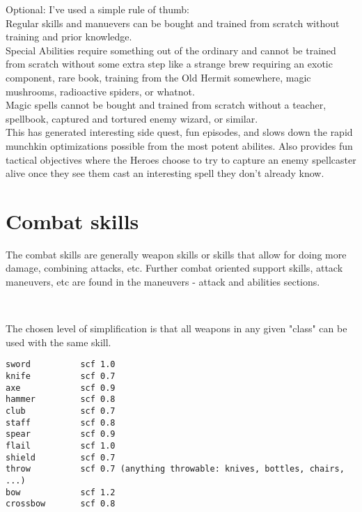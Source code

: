 Optional: I've used a simple rule of thumb: \\
Regular skills and manuevers can be bought and trained from scratch without training and prior knowledge. \\
Special Abilities require something out of the ordinary and cannot be trained from scratch without some extra step like a strange brew requiring an exotic component, rare book, training from the Old Hermit somewhere, magic mushrooms, radioactive spiders, or whatnot.\\
Magic spells cannot be bought and trained from scratch without a teacher, spellbook, captured and tortured enemy wizard, or similar.\\
This has generated interesting side quest, fun episodes, and slows down the rapid munchkin optimizations possible from the most potent abilites. Also provides fun tactical objectives where the Heroes choose to try to capture an enemy spellcaster alive once they see them cast an interesting spell they don't already know.

%










\section*{Combat skills}

The combat skills are generally weapon skills or skills that allow for doing more damage, combining attacks, etc. Further combat oriented support skills, attack maneuvers, etc are found in the maneuvers - attack and abilities sections.

\

\openskillslist

\begin{samepage}
 The chosen level of simplification is that all weapons in any given "class" can be used with the same skill.

\begin{verbatim}
sword          scf 1.0
knife          scf 0.7
axe            scf 0.9
hammer         scf 0.8
club           scf 0.7
staff          scf 0.8
spear          scf 0.9
flail          scf 1.0
shield         scf 0.7
throw          scf 0.7 (anything throwable: knives, bottles, chairs, ...)
bow            scf 1.2
crossbow       scf 0.8
\end{verbatim}
\end{samepage}

